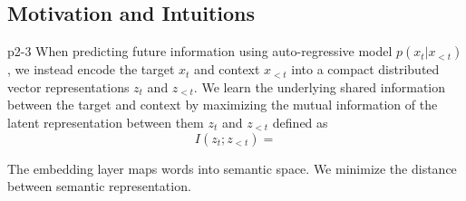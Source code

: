 \documentclass[a4paper]{article}
\begin{document}
	\subsection{Motivation and Intuitions}

	\cite{van2018representation}p2-3
	When predicting future information using auto-regressive model $p(x_t|x_{<t})$, we instead encode the target $x_t$ and context $x_{<t}$ into a compact distributed vector representations $z_t$ and $z_{<t}$.
	We learn the underlying shared information between the target and context by maximizing the mutual information of the latent representation between them $z_t$ and $z_{<t}$ defined as
	\begin{equation}
		I(z_t; z_{<t}) = 
	\end{equation}

	The embedding layer maps words into semantic space. We minimize the distance between semantic representation.


	
		
\end{document}
